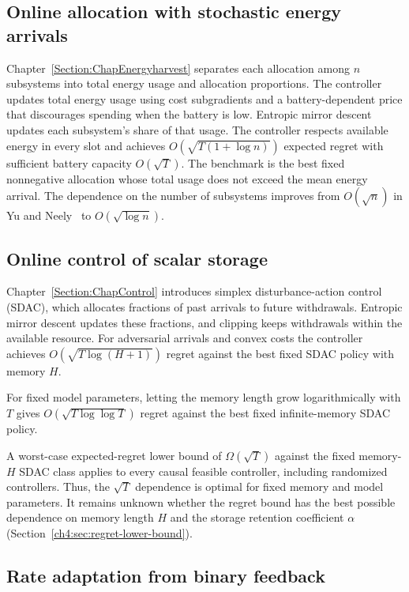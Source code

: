 \subsection{Online allocation with stochastic energy arrivals}

Chapter~\ref{Section:ChapEnergyharvest} separates each allocation among $n$
subsystems into total energy usage and allocation proportions. The controller
updates total energy usage using cost subgradients and a battery-dependent
price that discourages spending when the battery is low. Entropic mirror
descent updates each subsystem's share of that usage. The controller respects
available energy in every slot and
achieves $O(\sqrt{T(1+\log n)})$ expected regret with sufficient battery
capacity $O(\sqrt T)$. The benchmark is the best fixed nonnegative allocation
whose total usage does not exceed the mean energy arrival. The dependence on the number of subsystems
improves from $O(\sqrt n)$ in Yu and Neely~\cite{Yu2019} to
$O(\sqrt{\log n})$.

\subsection{Online control of scalar storage}

Chapter~\ref{Section:ChapControl} introduces simplex disturbance-action
control (SDAC), which allocates fractions of past arrivals to future
withdrawals. Entropic mirror descent updates these fractions, and clipping
keeps withdrawals within the available resource. For adversarial arrivals
and convex costs the controller achieves
$O(\sqrt{T\log(H+1)})$ regret against the best fixed SDAC policy with
memory $H$.

For fixed model parameters, letting the memory length grow logarithmically
with $T$ gives
$O(\sqrt{T\log\log T})$ regret against the best fixed infinite-memory
SDAC policy.

A worst-case expected-regret lower bound of $\Omega(\sqrt T)$ against the
fixed memory-$H$ SDAC class applies to every causal feasible controller,
including randomized controllers.
Thus, the $\sqrt T$ dependence is optimal for fixed memory and model
parameters. It remains unknown whether the regret bound has the best possible
dependence on memory length $H$ and the storage retention coefficient $\alpha$
(Section~\ref{ch4:sec:regret-lower-bound}).

\subsection{Rate adaptation from binary feedback}

